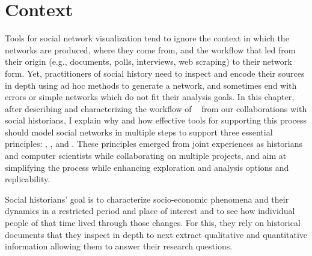 \section{Context}

Tools for social network visualization tend to ignore the context in which the networks are produced, where they come from, and the workflow that led from their origin (e.g., documents, polls, interviews, web scraping) to their network form.
Yet, practitioners of social history need to inspect and encode their sources in depth using ad hoc methods to generate a network, and sometimes end with errors or simple networks which do not fit their analysis goals\cite{lemercierQuantitativeMethodsHumanities2019}.
In this chapter, after describing and characterizing the workflow of \hsna~\cite{wetherellHistoricalSocialNetwork1998} from our collaborations with social historians, I explain why and how effective tools for supporting this process should model social networks in multiple steps to support three essential principles: \traceability, \reality, and \simplicity.
These principles emerged from joint experiences as historians and computer scientists while collaborating on multiple projects, and aim at simplifying the \hsna process while enhancing exploration and analysis options and replicability.

Social historians' goal is to characterize socio-economic phenomena and their dynamics in a restricted period and place of interest and to see how individual people of that time lived through those changes\cite{tilly1984retrieving}.
For this, they rely on historical documents that they inspect in depth to next extract qualitative and quantitative information allowing them to answer their research questions.

